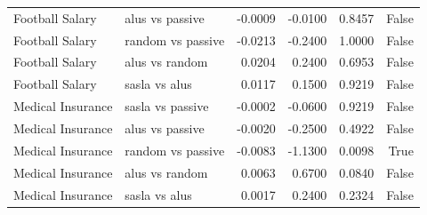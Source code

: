 \begin{table}
\begin{tabular}{llrrrr}
Football Salary & alus vs passive & -0.0009 & -0.0100 & 0.8457 & False \\
Football Salary & random vs passive & -0.0213 & -0.2400 & 1.0000 & False \\
Football Salary & alus vs random & 0.0204 & 0.2400 & 0.6953 & False \\
Football Salary & sasla vs alus & 0.0117 & 0.1500 & 0.9219 & False \\
Medical Insurance & sasla vs passive & -0.0002 & -0.0600 & 0.9219 & False \\
Medical Insurance & alus vs passive & -0.0020 & -0.2500 & 0.4922 & False \\
Medical Insurance & random vs passive & -0.0083 & -1.1300 & 0.0098 & True \\
Medical Insurance & alus vs random & 0.0063 & 0.6700 & 0.0840 & False \\
Medical Insurance & sasla vs alus & 0.0017 & 0.2400 & 0.2324 & False \\
\bottomrule
\end{tabular}
\end{table}
